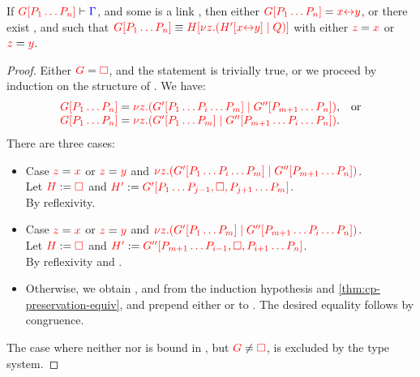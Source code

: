 \begin{lemmaB}\label{thm:cp-display-3}
  If $\seq[{ \cpPlug{G}{P_1 \dots P_n} }]{ \Gamma }$, and some  is a
  link , then either $\tm{\cpPlug{G}{P_1 \dots P_n}} =
  \tm{\cpLink{x}{y}}$, or there exist ,  and  such that
  \(
  \tm{\cpPlug{G}{P_1 \dots P_n}} \equiv
  \tm{\cpPlug{H}{\cpCut{z}{\cpPlug{H'}{\cpLink{x}{y}}}{Q}}}
  \)
  with either $\tm{z} = \tm{x}$ or $\tm{z} = \tm{y}$.
\end{lemmaB}
\begin{proof}
  Either $\tm{G} = \tm{\Box}$, and the statement is trivially true, or we
  proceed by induction on the structure of . We have:
  \begin{gather*}
    \begin{array}[t]{ll}
      \tm{\cpPlug{G}{P_1 \dots P_n}} = \tm{\cpCut{z}{\cpPlug{G'}{P_1\dots P_i\dots P_m}}{\cpPlug{G''}{P_{m+1}\dots P_n}}},&\text{or}
      \\
      \tm{\cpPlug{G}{P_1 \dots P_n}} = \tm{\cpCut{z}{\cpPlug{G'}{P_1\dots P_m}}{\cpPlug{G''}{P_{m+1}\dots P_i\dots P_n}}}. 
    \end{array}
  \end{gather*}
  There are three cases:
  \begin{itemize}
  \item
    Case $\tm{z} = \tm{x}$ or $\tm{z} = \tm{y}$
    and $\tm{\cpCut{z}{\cpPlug{G'}{P_1\dots P_i\dots P_m}}{\cpPlug{G''}{P_{m+1}\dots P_n}}}$.
    \\
    Let $\tm{H} := \tm{\Box}$ and $\tm{H'} := \tm{\cpPlug{G'}{P_1\dots P_{j-1},\Box,P_{j+1}\dots P_m}}$.
    \\[1ex]
    By reflexivity.
  \item
    Case $\tm{z} = \tm{x}$ or $\tm{z} = \tm{y}$
    and $\tm{\cpCut{z}{\cpPlug{G'}{P_1\dots P_m}}{\cpPlug{G''}{P_{m+1}\dots P_i\dots P_n}}}$.
    \\
    Let $\tm{H} := \tm{\Box}$ and $\tm{H'} := \tm{\cpPlug{G''}{P_{m+1}\dots P_{i-1},\Box,P_{i+1}\dots P_n}}$.
    \\
    By reflexivity and \cpEquivCutComm.
  \item
    Otherwise, we obtain ,  and  from the induction
    hypothesis and \cref{thm:cp-preservation-equiv}, and prepend either
     or
     to .
    The desired equality follows by congruence.
  \end{itemize}
  The case where neither  nor  is bound in , but $\tm{G} \neq
  \tm{\Box}$, is excluded by the type system.
\end{proof}
